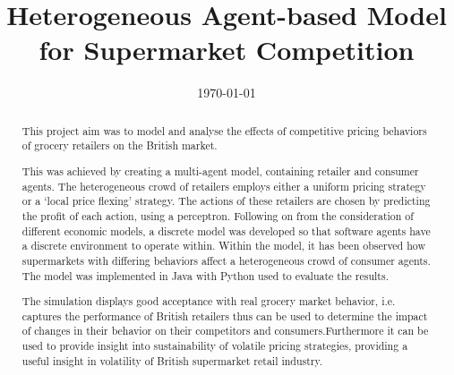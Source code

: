 \documentclass{ecsprogress}    %
\begin{document}
\frontmatter
\title      {Heterogeneous Agent-based Model for Supermarket Competition}
\addresses  {\groupname\\\deptname\\\univname}
\date       {\today}
\subject    {}
\keywords   {}

\maketitle
\begin{abstract}
This project aim was to model and analyse the effects of competitive pricing behaviors of grocery retailers on the British market. 

This was achieved by creating a multi-agent model, containing retailer and consumer agents. The heterogeneous crowd of retailers employs either a uniform pricing strategy or a ‘local price flexing’ strategy. The actions of these retailers are chosen by predicting the proﬁt of each action, using a perceptron. Following on from the consideration of different economic models, a discrete model was developed so that software agents have a discrete environment to operate within. Within the model, it has been observed how supermarkets with differing behaviors affect a heterogeneous crowd of consumer agents. The model was implemented in Java with Python used to evaluate the results. 

The simulation displays good acceptance with real grocery market behavior, i.e. captures the performance of British retailers thus can be used to determine the impact of changes in their behavior on their competitors and consumers.Furthermore it can be used to provide insight into sustainability of volatile pricing strategies, providing a useful insight in volatility of British supermarket retail industry. 
\end{abstract}
\end{document}
